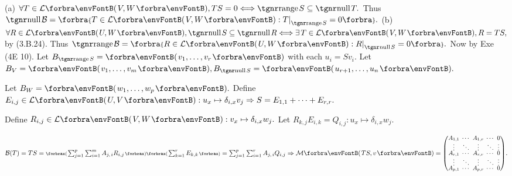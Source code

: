 (a) $\forall T\in\Lm{V,W},TS=0\Longleftrightarrow\range S\subseteq\null T.$ Thus $\null\mB=\Bra{T\in\Lm{V,W}:T\mmid_{\range S}=0}.$\parSol{\vspace{2pt}}
(b) $\forall R\in\Lm{U,W},\null S\subseteq\null R\Longleftrightarrow\exists\,T\in\Lm{V,W},R=TS,$ by (3.B.24).\parSol{\Hb}
Thus $\range\mB=\Bra{R\in\Lm{U,W}:R\mmid_{\null S}=0}.$ \;Now by Exe (4E 10).\PfEnd\vspace{4pt}\quad
\Or Let $B_{\range S}=\Par{v_1,\dots,v_r}$ with each $u_i=Sv_i.$ Let $B_V=\Par{v_1,\dots,v_m},B_{\null S}=\Par{u_{r+1},\dots,u_n}.$\par\quad
Let $B_W=\Par{w_1,\dots,w_p}.$ Define $E_{i,j}\in\Lm{U,V}:u_x\mapsto\delta_{i,x}v_j\Rightarrow S=E_{1,1}+\dots+E_{r,r}.$\par\quad
Define $R_{i,j}\in\Lm{V,W}:v_x\mapsto\delta_{i,x}w_j.$ Let $R_{k,j}E_{i,k}=Q_{i,j}:u_x\mapsto\delta_{i,x}w_j.$\par\vspace{-20pt}\quad
$\mB(T)=TS=\XPar{{\sum_{j=1}^p\sum_{i=1}^m A_{j,\,i}R_{i,j}}}\XPar{{\sum_{k=1}^r E_{k,k}}}=\sum_{j=1}^p\sum_{i=1}^r A_{j,\,i}Q_{i,j}\Rightarrow\Mt{TS,v}={\small\begin{pmatrix}
		A_{1,1} &\hspace{-6pt} \cdots &\hspace{-6pt} A_{1,r} &\hspace{-6pt} \cdots &\hspace{-6pt} 0\\[-2pt]
		\vdots  &\hspace{-6pt} \ddots &\hspace{-6pt} \vdots  &\hspace{-6pt} \ddots &\hspace{-6pt} \vdots\\[-4pt]
		A_{r,1} &\hspace{-6pt} \cdots &\hspace{-6pt} A_{r,r} &\hspace{-6pt} \cdots &\hspace{-6pt} 0\\[-2pt]
		\vdots  &\hspace{-6pt} \ddots &\hspace{-6pt} \vdots  &\hspace{-6pt} \ddots &\hspace{-6pt} \vdots\\[-4pt]
		A_{p,1} &\hspace{-6pt} \cdots &\hspace{-6pt} A_{p,r} &\hspace{-6pt} \cdots &\hspace{-6pt} 0\end{pmatrix}}.$\par\vspace{-20pt}\quad

